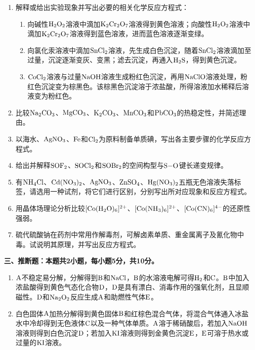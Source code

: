 \begin{enumerate}[label=\arabic*., itemsep=1.5ex]
    \item 解释或给出实验现象并写出必要的相关化学反应方程式：
    \begin{enumerate}[label=(\arabic*), noitemsep, topsep=0pt, partopsep=0pt]
        \item 向碱性$\ce{H2O2}$溶液中滴加$\ce{K2Cr2O7}$溶液得到黄色溶液；向酸性$\ce{H2O2}$溶液中滴加$\ce{K2Cr2O7}$溶液得到蓝色溶液，进而蓝色溶液逐渐变绿。
        \item 向氯化汞溶液中滴加$\ce{SnCl2}$溶液，先生成白色沉淀，随着$\ce{SnCl2}$溶液滴加至过量，沉淀逐渐变灰、变黑；滤去沉淀，再通入$\ce{H2S}$，得到黄色沉淀。
        \item $\ce{CoCl2}$溶液与过量$\ce{NaOH}$溶液生成粉红色沉淀，再用$\ce{NaClO}$溶液处理，粉红色沉淀变为棕黑色。该棕黑色沉淀溶于浓盐酸，所得溶液加水稀释后溶液变为粉红色。
    \end{enumerate}

    \item 比较$\ce{Na2CO3}$、$\ce{MgCO3}$、$\ce{K2CO3}$、$\ce{MnCO3}$和$\ce{PbCO3}$的热稳定性，并简述理由。

    \item 以海水、$\ce{AgNO3}$、$\ce{Fe}$和$\ce{Cl2}$为原料制备单质碘，写出各主要步骤的化学反应方程式。

    \item 给出并解释$\ce{SOF2}$、$\ce{SOCl2}$和$\ce{SOBr2}$的空间构型与$\ce{S-O}$键长递变规律。

    \item 有$\ce{NH4Cl}$、$\ce{Cd(NO3)2}$、$\ce{AgNO3}$、$\ce{ZnSO4}$、$\ce{Hg(NO3)2}$五瓶无色溶液失落标签，请选用一种试剂，将它们进行区别，分别写出所对应现象和反应方程式。

    \item 用晶体场理论分析比较$[\ce{Co(H2O)6}]^{2+}$、$[\ce{Co(NH3)6}]^{2+}$、$[\ce{Co(CN)6}]^{4-}$的还原性强弱。

    \item 硫代硫酸钠在药剂中常用作解毒剂，可解卤素单质、重金属离子及氰化物中毒。试说明其原理，并写出反应方程式。
\end{enumerate}

\vspace{0.5cm}
\noindent\textbf{三、推断题：本题共2小题，每小题5分，共10分。}

\begin{enumerate}[label=\arabic*., itemsep=1.5ex]
    \item $\ce{A}$不稳定易分解，分解得到$\ce{B}$和$\ce{NaCl}$，$\ce{B}$的水溶液电解可得$\ce{H2}$和$\ce{C}$。$\ce{B}$中加入浓盐酸得到黄色气态化合物$\ce{D}$，$\ce{D}$是具有漂白、消毒作用的强氧化剂，且显顺磁性。$\ce{D}$和$\ce{Na2O2}$反应生成$\ce{A}$和助燃性气体$\ce{E}$。

    \item 白色固体$\ce{A}$加热分解得到黄色固体$\ce{B}$和红棕色混合气体，将混合气体通入冰盐水中冷却得到无色液体$\ce{C}$以及一种气体单质。$\ce{A}$溶于稀硝酸后，若加入$\ce{NaOH}$溶液则得到白色沉淀$\ce{D}$；若加入$\ce{KI}$溶液则得到金黄色沉淀$\ce{E}$，$\ce{E}$可溶于热水或过量的$\ce{KI}$溶液。
\end{enumerate}

